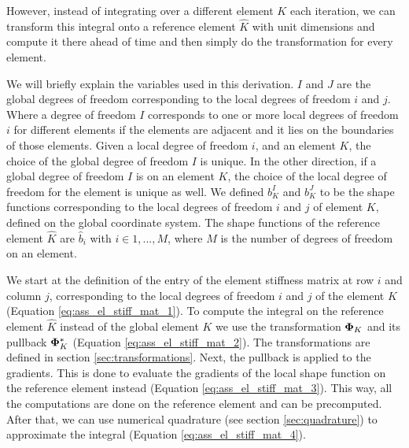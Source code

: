 However, instead of integrating over a different element $K$ each iteration,
we can transform this integral onto a reference element $\hat{K}$ with unit dimensions
and compute it there ahead of time and then simply do the transformation for every element.

We will briefly explain the variables used in this derivation.
$I$ and $J$ are the global degrees of freedom corresponding to the local degrees of freedom $i$ and $j$.
Where a degree of freedom $I$ corresponds to one or more local degrees of freedom $i$ for different elements if the elements are adjacent
and it lies on the boundaries of those elements.
Given a local degree of freedom $i$, and an element $K$, the choice of the global degree of freedom $I$ is unique.
In the other direction, if a global degree of freedom $I$ is on an element $K$,
the choice of the local degree of freedom for the element is unique as well.
We defined $b_K^I$ and $b_K^J$ to be the shape functions corresponding to the local degrees of freedom $i$ and $j$
of element $K$, defined on the global coordinate system.
The shape functions of the reference element $\hat{K}$ are $\hat{b}_i$ with $i \in {1, ..., M}$, where $M$ is the number
of degrees of freedom on an element.

We start at the definition of the entry of the element stiffness matrix at row $i$ and column $j$,
corresponding to the local degrees of freedom $i$ and $j$ of the element $K$ (Equation \ref{eq:ass_el_stiff_mat_1}).
To compute the integral on the reference element $\hat{K}$ instead of the global element $K$
we use the transformation $\mathbf{\Phi}_K$ and its pullback $\mathbf{\Phi}_K^*$ (Equation \ref{eq:ass_el_stiff_mat_2}).
The transformations are defined in section \ref{sec:transformations}.
Next, the pullback is applied to the gradients. This is done to evaluate the gradients of the local shape function on the reference element instead (Equation \ref{eq:ass_el_stiff_mat_3}).
This way, all the computations are done on the reference element and can be precomputed.
After that, we can use numerical quadrature (see section \ref{sec:quadrature}) to approximate the integral (Equation \ref{eq:ass_el_stiff_mat_4}).


